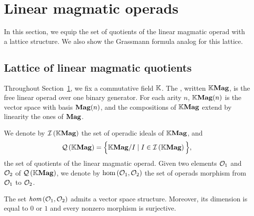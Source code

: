 
\section{Linear magmatic operads}
\label{sec:Magmatic_operads}

In this section, we equip the set of quotients of the linear magmatic
operad with a lattice structure. We also show the Grassmann formula
analog for this lattice.

\subsection{Lattice of linear magmatic quotients}

Throughout Section~\ref{sec:Magmatic_operads}, we fix a commutative field
$\mathbb{K}$. The , written $\mathbb{K}\mathbf{Mag}$, is the free
linear operad over one binary generator. For each arity $n$, $\mathbb{K}\mathbf{Mag}(n)$
is the vector space with basis $\mathbf{Mag}(n)$, and the compositions of $\mathbb{K}\mathbf{Mag}$
extend by linearity the ones of $\mathbf{Mag}$.

We denote by $\mathcal{I}\left(\mathbb{K}\mathbf{Mag}\right)$ the set of operadic ideals of $\mathbb{K}\mathbf{Mag}$, and
\begin{equation} \label{equ:definition_of_QMag}
  \mathcal{Q}\left(\mathbb{K}\mathbf{Mag}\right) =\Big\{\mathbb{K}\mathbf{Mag}/ I\mid I\in\mathcal{I}\left(\mathbb{K}\mathbf{Mag}\right)\Big\},
  \end{equation}
the set of quotients of the linear magmatic operad. Given two elements
$\mathcal{O}_1$ and $\mathcal{O}_2$ of $\mathcal{Q}\left(\mathbb{K}\mathbf{Mag}\right)$, we denote by
$\text{hom}\left(\mathcal{O}_1,\mathcal{O}_2\right)$ the set of operads morphism from
$\mathcal{O}_1$ to $\mathcal{O}_2$.

\begin{Proposition} \label{prop:endomorphisms_of_magmatic_operads}
  The set $\emph{hom}\left(\mathcal{O}_1,\mathcal{O}_2\right)$ admits a vector space
  structure. Moreover, its dimension is equal to $0$ or $1$ and every
  nonzero morphism is surjective.
\end{Proposition}

